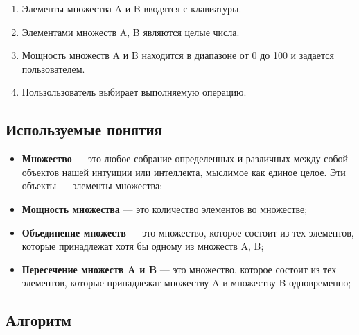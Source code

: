\documentclass[a4paper,12pt]{extarticle}
\begin{document}
\begin{enumerate}
  \item Элементы множества A и B вводятся с клавиатуры.
  \item Элементами множеств A, B являются целые числа.
  \item Мощность множеств A и B находится в диапазоне от 0 до 100 и задается пользователем.
  \item Пользользователь выбирает выполняемую операцию.
\end{enumerate}
\begin{center}
\section*{Используемые понятия}
\end{center}
\begin{itemize}
  \item\textbf{Множество} — это любое собрание определенных и различных между собой объектов нашей интуиции или интеллекта, мыслимое как единое целое. Эти объекты — элементы множества;
  \item\textbf{Мощность множества} — это количество элементов во множестве;
  \item\textbf{Объединение множеств} — это множество, которое состоит из тех элементов, которые принадлежат хотя бы одному из множеств A, B;
  \item\textbf{Пересечение множеств A и B} — это множество, которое состоит из тех элементов, которые  принадлежат множеству A и множеству B одновременно;
\end{itemize}
\begin{center}
\section*{Алгоритм}
\end{center}
\end{document}
